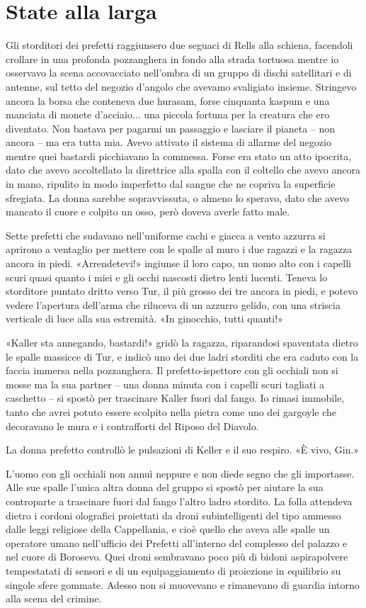 \chapter{State alla larga}

Gli storditori dei prefetti raggiunsero due seguaci di Rells alla
schiena, facendoli crollare in una profonda pozzanghera in fondo alla
strada tortuosa mentre io osservavo la scena accovacciato nell'ombra di
un gruppo di dischi satellitari e di antenne, sul tetto del negozio
d'angolo che avevamo svaligiato insieme. Stringevo ancora la borsa che
conteneva due hurasam, forse cinquanta kaspum e una manciata di monete
d'acciaio... una piccola fortuna per la creatura che ero diventato. Non
bastava per pagarmi un passaggio e lasciare il pianeta -- non ancora --
ma era tutta mia. Avevo attivato il sistema di allarme del negozio
mentre quei bastardi picchiavano la commessa. Forse era stato un atto
ipocrita, dato che avevo accoltellato la direttrice alla spalla con il
coltello che avevo ancora in mano, ripulito in modo imperfetto dal
sangue che ne copriva la superficie sfregiata. La donna sarebbe
sopravvissuta, o almeno lo speravo, dato che avevo mancato il cuore e
colpito un osso, però doveva averle fatto male.

Sette prefetti che sudavano nell'uniforme cachi e giacca a vento azzurra
si aprirono a ventaglio per mettere con le spalle al muro i due ragazzi
e la ragazza ancora in piedi. «Arrendetevi!» ingiunse il loro capo, un
uomo alto con i capelli scuri quasi quanto i miei e gli occhi nascosti
dietro lenti lucenti. Teneva lo storditore puntato dritto verso Tur, il
più grosso dei tre ancora in piedi, e potevo vedere l'apertura dell'arma
che riluceva di un azzurro gelido, con una striscia verticale di luce
alla sua estremità. «In ginocchio, tutti quanti!»

«Kaller sta annegando, bastardi!» gridò la ragazza, riparandosi
spaventata dietro le spalle massicce di Tur, e indicò uno dei due ladri
storditi che era caduto con la faccia immersa nella pozzanghera. Il
prefetto-ispettore con gli occhiali non si mosse ma la sua partner --
una donna minuta con i capelli scuri tagliati a caschetto -- si spostò
per trascinare Kaller fuori dal fango. Io rimasi immobile, tanto che
avrei potuto essere scolpito nella pietra come uno dei gargoyle che
decoravano le mura e i contrafforti del Riposo del Diavolo.

La donna prefetto controllò le pulsazioni di Keller e il suo respiro. «È
vivo, Gin.»

L'uomo con gli occhiali non annuì neppure e non diede segno che gli
importasse. Alle sue spalle l'unica altra donna del gruppo si spostò per
aiutare la sua controparte a trascinare fuori dal fango l'altro ladro
stordito. La folla attendeva dietro i cordoni olografici proiettati da
droni subintelligenti del tipo ammesso dalle leggi religiose della
Cappellania, e cioè quello che aveva alle spalle un operatore umano
nell'ufficio dei Prefetti all'interno del complesso del palazzo e nel
cuore di Borosevo. Quei droni sembravano poco più di bidoni
aspirapolvere tempestatati di sensori e di un equipaggiamento di
proiezione in equilibrio su singole sfere gommate. Adesso non si
muovevano e rimanevano di guardia intorno alla scena del crimine.

